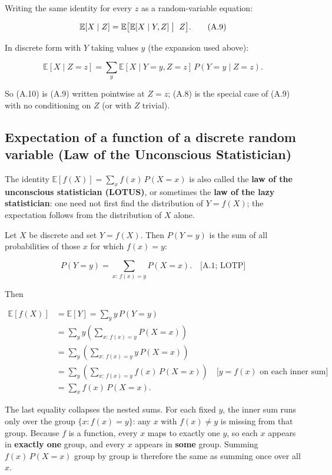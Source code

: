 Writing the same identity for every $z$ as a random-variable equation:

\begin{equation}
\mathbb{E}[X\mid Z]
=
\mathbb{E}\bigl[\mathbb{E}[X\mid Y,Z]\bigm|\ Z\bigr].
\tag{A.9}
\end{equation}

In discrete form with $Y$ taking values $y$ (the expansion used above):

\begin{equation}
\mathbb{E}[X\mid Z=z]
=
\sum_y \mathbb{E}[X\mid Y=y,Z=z]\, P(Y=y\mid Z=z).
\tag{A.10}
\end{equation}

So (A.10) is (A.9) written pointwise at $Z=z$; (A.8) is the special case of (A.9) with no conditioning on $Z$ (or with $Z$ trivial).

\subsection{Expectation of a function of a discrete random variable (Law of the Unconscious Statistician)}

The identity $\mathbb{E}[f(X)]=\sum_x f(x)\,P(X=x)$ is also called the \textbf{law of the unconscious statistician (LOTUS)}, or sometimes the \textbf{law of the lazy statistician}: one need not first find the distribution of $Y=f(X)$; the expectation follows from the distribution of $X$ alone.

Let $X$ be discrete and set $Y=f(X)$. Then $P(Y=y)$ is the sum of all probabilities of those $x$ for which $f(x)=y$:

\[
P(Y=y)
=
\sum_{x:\,f(x)=y} P(X=x).
\quad\text{[A.1; LOTP]}
\]

Then

\begin{equation}
\begin{aligned}
\mathbb{E}[f(X)]
&=
\mathbb{E}[Y]
=
\sum_y y\, P(Y=y)
\\
&=
\sum_y y
\left(
\sum_{x:\,f(x)=y} P(X=x)
\right)
\\
&=
\sum_y
\left(
\sum_{x:\,f(x)=y} y\, P(X=x)
\right)
\\
&=
\sum_y
\left(
\sum_{x:\,f(x)=y} f(x)\, P(X=x)
\right)
\quad\text{[$y=f(x)$ on each inner sum]}
\\
&=
\sum_x f(x)\, P(X=x).
\end{aligned}
\tag{A.12}
\end{equation}

The last equality collapses the nested sums. For each fixed $y$, the inner sum runs only over the group $\{x:f(x)=y\}$: any $x$ with $f(x)\neq y$ is missing from that group. Because $f$ is a function, every $x$ maps to exactly one $y$, so each $x$ appears in \textbf{exactly one} group, and every $x$ appears in \textbf{some} group. Summing $f(x)\,P(X=x)$ group by group is therefore the same as summing once over all $x$.


